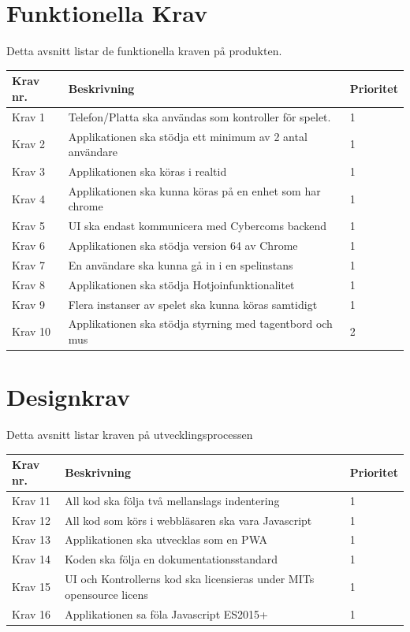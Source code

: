\documentclass[10pt]{article}
\begin{document}
\pagebreak
\section{Funktionella Krav}
	Detta avsnitt listar de funktionella kraven på produkten.	
	
	\begin{tabular}{| p{2cm} | p{8cm} | p{2cm}|}
		\hline
		
		\textbf{Krav nr.} & \textbf{Beskrivning} &\textbf{Prioritet} \\ \hline
		Krav 1 & Telefon/Platta ska användas som kontroller för spelet. & 1 \\ \hline
		Krav 2 & Applikationen ska stödja ett minimum av 2 antal användare & 1 \\ \hline
		Krav 3 & Applikationen ska köras i realtid & 1 \\ \hline
		Krav 4 & Applikationen ska kunna köras på en enhet som har chrome & 1 \\ \hline
		Krav 5 & UI ska endast kommunicera med Cybercoms backend & 1 \\ \hline
		Krav 6 & Applikationen ska stödja version 64 av Chrome & 1 \\ \hline
		Krav 7 & En användare ska kunna gå in i en spelinstans & 1 \\ \hline
		Krav 8 & Applikationen ska stödja Hotjoinfunktionalitet & 1 \\ \hline
		Krav 9 & Flera instanser av spelet ska kunna köras samtidigt & 1 \\ \hline
		Krav 10 & Applikationen ska stödja styrning med tagentbord och mus & 2 \\ \hline
		
		
	\end{tabular}
	
\section{Designkrav}
	Detta avsnitt listar kraven på utvecklingsprocessen
	
	\begin{tabular}{| p{2cm} | p{8cm} | p{2cm}|}
		\hline
		\textbf{Krav nr.} & \textbf{Beskrivning} & \textbf{Prioritet} \\ \hline
		Krav 11 & All kod ska följa två mellanslags indentering & 1\\ \hline
		Krav 12 & All kod som körs i webbläsaren ska vara Javascript & 1 \\ \hline
		Krav 13 & Applikationen ska utvecklas som en PWA & 1 \\ \hline
		Krav 14 & Koden ska följa en dokumentationsstandard & 1 \\ \hline
		Krav 15 & UI och Kontrollerns kod ska licensieras under MITs opensource licens & 1 \\ \hline
		Krav 16 & Applikationen sa föla Javascript ES2015+ & 1 \\ \hline
	\end{tabular}
\pagebreak
\end{document}
